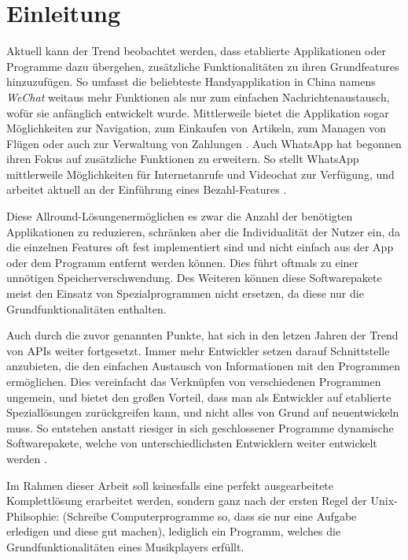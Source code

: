 
\chapter{Einleitung}
Aktuell kann der Trend beobachtet werden, dass etablierte Applikationen oder
Programme dazu übergehen, zusätzliche Funktionalitäten zu ihren Grundfeatures
hinzuzufügen. So umfasst die beliebteste Handyapplikation in China namens
\textit{WeChat} weitaus mehr Funktionen als nur zum einfachen
Nachrichtenaustausch, wofür sie anfänglich entwickelt wurde. Mittlerweile
bietet die Applikation sogar Möglichkeiten zur Navigation, zum
Einkaufen von Artikeln, zum Managen von Flügen oder auch zur Verwaltung von
Zahlungen \autocite{was_ist_wechat?_2019}. Auch WhatsApp hat begonnen ihren
Fokus auf zusätzliche Funktionen zu erweitern. So stellt WhatsApp mittlerweile
Möglichkeiten für Internetanrufe und Videochat zur Verfügung, und arbeitet
aktuell an der Einführung eines Bezahl-Features \autocite{shead_2019}. \hfill
\break


Diese \glqq Allround-Lösungen\grqq \space ermöglichen es zwar die Anzahl der
benötigten Applikationen zu reduzieren, schränken aber die Individualität der
Nutzer ein, da die einzelnen Features oft fest implementiert sind und nicht
einfach aus der App oder dem Programm entfernt werden können. Dies führt
oftmals zu einer unnötigen Speicherverschwendung. Des Weiteren können diese
Softwarepakete meist den Einsatz von Spezialprogrammen nicht ersetzen, da diese
nur die Grundfunktionalitäten enthalten. \hfill \break


Auch durch die zuvor genannten Punkte, hat sich in den letzen Jahren der Trend
von \acp{API} weiter fortgesetzt. Immer mehr Entwickler setzen darauf
Schnittstelle anzubieten, die den einfachen Austausch von Informationen mit den
Programmen ermöglichen. Dies vereinfacht das Verknüpfen von verschiedenen
Programmen ungemein, und bietet den großen Vorteil, dass man als Entwickler auf
etablierte Speziallösungen zurückgreifen kann, und nicht alles von Grund auf
neuentwickeln muss. So entstehen anstatt riesiger in sich geschlossener Programme
dynamische Softwarepakete, welche von unterschiedlichsten Entwicklern weiter
entwickelt werden \autocite{babati_2018} \autocite{sandoval_2018}. \hfill
\break


Im Rahmen dieser Arbeit soll keinesfalls eine perfekt ausgearbeitete
Komplettlösung erarbeitet werden, sondern ganz nach der ersten Regel der
Unix-Philsophie: (\glqq Schreibe Computerprogramme so, dass sie nur eine
Aufgabe erledigen und diese gut machen\grqq \space \autocite{gancarz_1997}), lediglich
ein Programm, welches die Grundfunktionalitäten eines Musikplayers erfüllt.
\hfill \break


